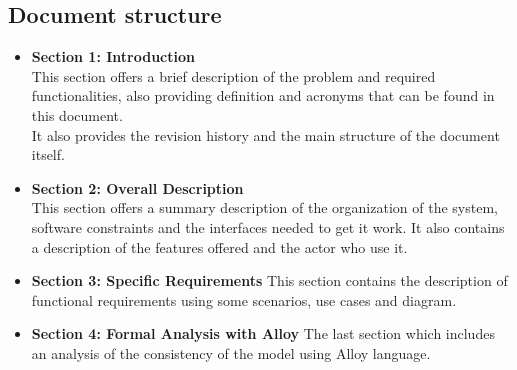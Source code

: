 \subsection{Document structure}
\begin{itemize}
    \item \textbf{Section 1: Introduction}\\
    This section offers a brief description of the problem and required functionalities, also providing definition and acronyms that can be found in this document.\\
    It also provides the revision history and the main structure of the document itself.
    
    \item \textbf{Section 2: Overall Description}\\
    This section offers a summary description of the organization of the system, software constraints and the interfaces needed to get it work. It also contains a description of the features offered and the actor who use it.
    
    \item \textbf{Section 3: Specific Requirements}
    This section contains the description of functional requirements using some scenarios, use cases and diagram. 
    
    \item \textbf{Section 4: Formal Analysis with Alloy}
    The last section which includes an analysis of the consistency of the model using Alloy language.
\end{itemize}